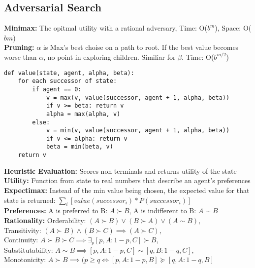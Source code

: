 \documentclass[11pt, a4paper]{article}
\begin{document}
\begin{multicols*}{1}
        \section*{Adversarial Search}
            \textbf{Minimax:} The opitmal utility with a rational adversary, Time: O($b^m$), Space: O($bm$)\\
            \textbf{Pruning:} $\alpha$ is Max's best choise on a path to root. If the best value becomes worse than $\alpha$, no point in exploring children. Similiar for $\beta$. Time: O($b^{m / 2}$)
            \begin{verbatim}
def value(state, agent, alpha, beta):
    for each successor of state:
        if agent == 0:
            v = max(v, value(successor, agent + 1, alpha, beta))
            if v >= beta: return v
            alpha = max(alpha, v)
        else:
            v = min(v, value(successor, agent + 1, alpha, beta))
            if v <= alpha: return v
            beta = min(beta, v)
    return v
            \end{verbatim}
            \textbf{Heuristic Evaluation:} Scores non-terminals and returns utility of the state\\
            \textbf{Utility:} Function from state to real numbers that describe an agent's preferences\\
            \textbf{Expectimax:} Instead of the min value being chosen, the expected value for that state is returned: $\sum_{i} [value(successor_{i}) * P(successor_{i})]$\\
            \textbf{Preferences:} A is preferred to B: $A \succ B$, A is indifferent to B: $A \sim B$\\
            \textbf{Rationality:} Orderability: $(A \succ B) \vee (B \succ A) \vee (A \sim B)$,\\ Transitivity: $(A \succ B) \land (B \succ C) \implies (A \succ C)$,\\ Continuity: $A \succ B \succ C \implies \exists_{p} [p, A: 1 - p, C] \succ B$, \\Substitutability: $A \sim B \implies [p, A: 1 - p, C] \sim [q, B: 1 - q, C]$, \\Monotonicity: $A \succ B \implies (p \geq q \iff [p, A: 1 - p, B] \succeq [q, A: 1 - q, B]$

\end{multicols*}
\end{document}
